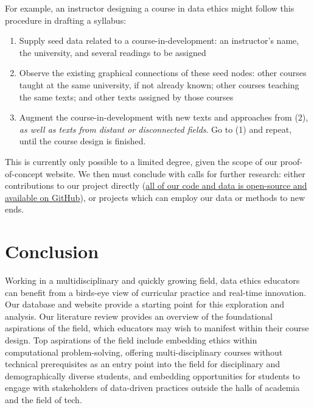 \documentclass[
]{article}
\providecommand{\tightlist}{%
  \setlength{\itemsep}{0pt}\setlength{\parskip}{0pt}}
\begin{document}
For example, an instructor designing a course in data ethics might
follow this procedure in drafting a syllabus:

\begin{enumerate}
\def\labelenumi{\arabic{enumi}.}
\tightlist
\item
  Supply seed data related to a course-in-development: an instructor's
  name, the university, and several readings to be assigned
\item
  Observe the existing graphical connections of these seed nodes: other
  courses taught at the same university, if not already known; other
  courses teaching the same texts; and other texts assigned by those
  courses
\item
  Augment the course-in-development with new texts and approaches from
  (2), \emph{as well as texts from distant or disconnected fields}. Go
  to (1) and repeat, until the course design is finished.
\end{enumerate}

This is currently only possible to a limited degree, given the scope of
our proof-of-concept website. We then must conclude with calls for
further research: either contributions to our project directly
(\href{https://github.com/JonathanReeve/data-ethics-literature-review}{all
of our code and data is open-source and available on GitHub}), or
projects which can employ our data or methods to new ends.

\hypertarget{conclusion}{%
\section{Conclusion}\label{conclusion}}

Working in a multidisciplinary and quickly growing field, data ethics
educators can benefit from a birds-eye view of curricular practice and
real-time innovation. Our database and website provide a starting point
for this exploration and analysis. Our literature review provides an
overview of the foundational aspirations of the field, which educators
may wish to manifest within their course design. Top aspirations of the
field include embedding ethics within computational problem-solving,
offering multi-disciplinary courses without technical prerequisites as
an entry point into the field for disciplinary and demographically
diverse students, and embedding opportunities for students to engage
with stakeholders of data-driven practices outside the halls of academia
and the field of tech.
\end{document}
